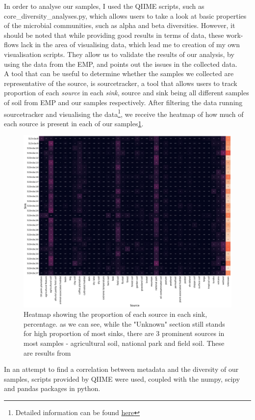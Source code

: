 \documentclass{article}
\begin{document}
\begin{multicols}{2}
In order to analyse our samples, I used the QIIME scripts, such as core\_diversity\_analyses.py, which allows users to take a look at basic properties of the microbial communities, such as alpha and beta diversities. However, it should be noted that while providing good results in terms of data, these work-flows lack in the area of visualising data, which lead me to creation of my own visualisation scripts\cite{Anonymous2018}. They allow us to validate the results of our analysis, by using the data from the EMP, and points out the issues in the collected data.\\
%
A tool that can be useful to determine whether the samples we collected are representative of the source, is sourcetracker\cite{Knights2011}, a tool that allows users to track proportion of each \textit{source} in each \textit{sink}, source and sink being all different samples of soil from EMP and our samples respectively. After filtering the data running sourcetracker and visualising the data\footnote{Detailed information can be found \href{https://github.com/nameisBaron-MichaelBaron/BIOC3301/tree/master/sourcetracker}{here}}, we receive the heatmap of how much of each source is present in each of our samples\ref{fig:sourcetracker_heatmap}.
\begin{figure}[H]
	\includegraphics[width=1\linewidth]{../sourcetracker/heatmap_perc.png}
	\caption{Heatmap showing the proportion of each source in each sink, percentage. as we can see, while the "Unknown" section still stands for high proportion of most sinks, there are 3 prominent sources in most samples - agricultural soil, national park and field soil. These are results from }
	\label{fig:sourcetracker_heatmap}
\end{figure}
In an attempt to find a correlation between metadata and the diversity of our samples, scripts provided by QIIME were used, coupled with the numpy, scipy and pandas packages in python.  


\end{multicols}
\end{document}
